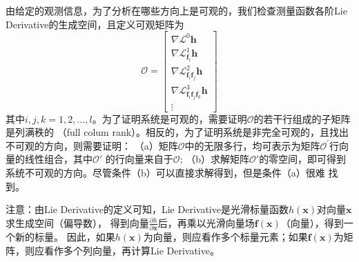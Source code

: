 \documentclass{article}
\begin{document}
由给定的观测信息，为了分析在哪些方向上是可观的，我们检查测量函数各阶Lie Derivative的生成空间，且定义可观矩阵为
\begin{equation}
    \mathcal{O}=
    \left[ \begin{array}{c}
        \nabla\mathcal{L}^0\textbf{h}\\
        \nabla\mathcal{L}_{\textbf{f}_i}^{1}\textbf{h}\\
        \nabla\mathcal{L}_{\textbf{f}_i\textbf{f}_j}^{2}\textbf{h}\\
        \nabla\mathcal{L}_{\textbf{f}_i\textbf{f}_j\textbf{f}_k}^{3}\textbf{h}\\
        \vdots
    \end{array}\right]
\end{equation}
其中$i,j,k=1,2,\dots,l$。为了证明系统是可观的，需要证明$\mathcal{O}$的若干行组成的子矩阵是列满秩的
（full colum rank）。相反的，为了证明系统是非完全可观的，且找出不可观的方向，则需要证明：
（a）矩阵$\mathcal{O}$中的无限多行，均可表示为矩阵$\mathcal{O}^\prime$行向量的线性组合，其中$\mathcal{O}\prime$
的行向量来自于$\mathcal{O}$;
（b）求解矩阵$\mathcal{O}\prime$的零空间，即可得到系统不可观的方向。尽管条件（b）可以直接求解得到，但是条件（a）很难
找到。
\par
{\color{red}注意：由Lie Derivative的定义可知，Lie Derivative是光滑标量函数$h(\textbf{x})$对向量$\textbf{x}$求生成空间（偏导数），
得到向量$\frac{\partial{h}}{\partial\textbf{x}}$后，再乘以光滑向量场$\textbf{f}(\textbf{x})$（向量），得到一个新的标量。
因此，如果$h(\textbf{x})$为向量，则应看作多个标量元素；如果$\textbf{f}(\textbf{x})$为矩阵，则应看作多个列向量，再计算Lie Derivative。}
\end{document}
